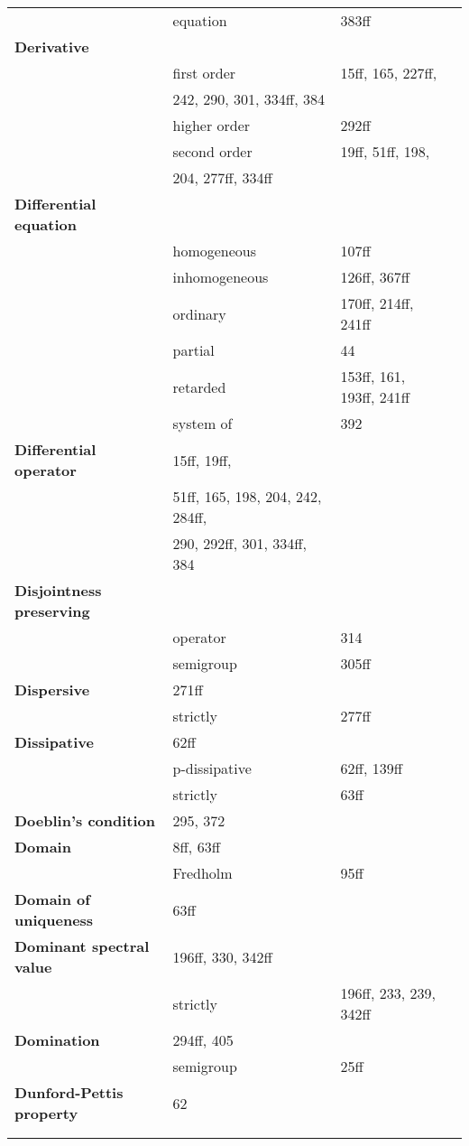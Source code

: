 \begin{longtable}{>{\bfseries}p{5cm}p{4cm}p{4cm}p{4cm}}
	& equation 	& 383ff \\
Derivative 	& \\
	& first order 	& 15ff, 165, 227ff, \\
	&   242, 290, 301, 334ff, 384 \\
	& higher order 	& 292ff \\
	& second order 	& 19ff, 51ff, 198, \\
	&   204, 277ff, 334ff \\
Differential equation 	& \\
	& homogeneous 	& 107ff \\
	& inhomogeneous 	& 126ff, 367ff \\
	& ordinary 	& 170ff, 214ff, 241ff \\
	& partial 	& 44 \\
	& retarded 	& 153ff, 161, 193ff, 241ff \\
	& system of 	& 392 \\
Differential operator 	& 15ff, 19ff, \\
	&   51ff, 165, 198, 204, 242, 284ff, \\
	&   290, 292ff, 301, 334ff, 384 \\
Disjointness preserving 	& \\
	& operator 	& 314 \\
	& semigroup 	& 305ff \\ 
Dispersive 	& 271ff \\
	& strictly 	& 277ff \\
Dissipative 	& 62ff \\
	& p-dissipative 	& 62ff, 139ff \\
	& strictly 	& 63ff \\
Doeblin's condition 	& 295, 372 \\ 
Domain 	& 8ff, 63ff \\
	& Fredholm 	& 95ff \\
Domain of uniqueness 	& 63ff \\
Dominant spectral value 	& 196ff, 330, 342ff \\
	& strictly 	& 196ff, 233, 239, 342ff \\
Domination 	& 294ff, 405 \\
	& semigroup 	& 25ff \\
Dunford-Pettis property 	& 62 \\
	& \\
\\

\end{longtable}
